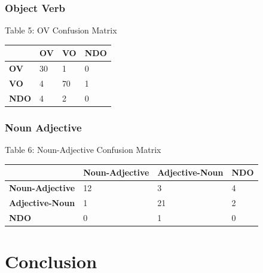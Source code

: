 \documentclass[]{aiaa-tc}
\begin{document}
\subsubsection{Object Verb}
\begin{center}
Table 5: OV Confusion Matrix
\end{center}
\begin{flushleft}
\begin{tabularx}{\textwidth}{|X|X|X|X|}
\hline
& \textbf{OV} & \textbf{VO} & \textbf{NDO} \\ \hline
\textbf{OV} & 30  & 1   & 0   \\ \hline
\textbf{VO} & 4   & 70  & 1   \\ \hline
\textbf{NDO} & 4   & 2   & 0   \\ \hline
\hline
\end{tabularx}
\end{flushleft}
\vspace{0.6cm}

\subsubsection{Noun Adjective}
\begin{center}
Table 6: Noun-Adjective Confusion Matrix
\end{center}
\begin{flushleft}
\begin{tabularx}{\textwidth}{|X|X|X|X|}
\hline
& \textbf{Noun-Adjective} & \textbf{Adjective-Noun} & \textbf{NDO} \\ \hline
\textbf{Noun-Adjective} & 12  & 3   & 4   \\ \hline
\textbf{Adjective-Noun} & 1   & 21  & 2   \\ \hline
\textbf{NDO} & 0   & 1   & 0   \\ \hline
\hline
\end{tabularx}
\end{flushleft}
\vspace{0.6cm}


\section{Conclusion}


\pagebreak



\end{document}
